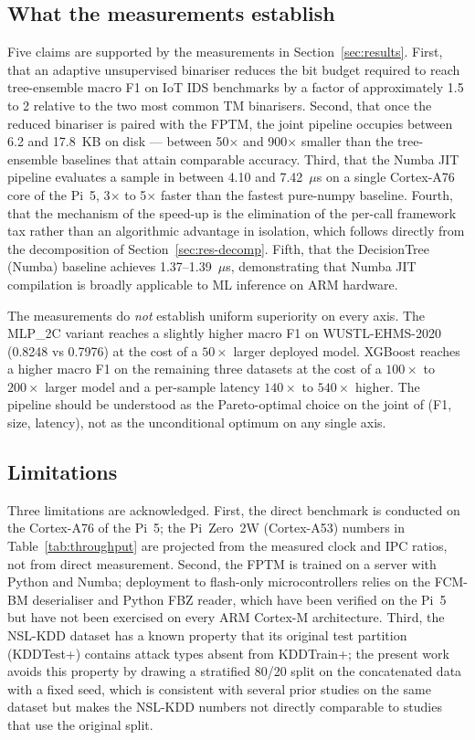 \documentclass[journal,10pt]{IEEEtran}
\begin{document}
\subsection{What the measurements establish}
\label{sec:disc-establish}
Five claims are supported by the measurements in
Section~\ref{sec:results}. First, that an adaptive unsupervised
binariser reduces the bit budget required to reach tree-ensemble
macro F1 on IoT IDS benchmarks by a factor of approximately 1.5 to
2 relative to the two most common TM binarisers. Second, that once
the reduced binariser is paired with the FPTM, the joint pipeline
occupies between 6.2 and 17.8~KB on disk --- between 50$\times$
and 900$\times$ smaller than the tree-ensemble baselines that attain
comparable accuracy. Third, that the Numba JIT pipeline evaluates a
sample in between 4.10 and 7.42~$\mu$s on a single Cortex-A76 core
of the Pi~5, 3$\times$ to 5$\times$ faster than the fastest
pure-numpy baseline. Fourth, that the mechanism of the
speed-up is the elimination of the per-call framework tax rather than
an algorithmic advantage in isolation, which follows directly from the
decomposition of Section~\ref{sec:res-decomp}. Fifth, that the
DecisionTree (Numba) baseline achieves 1.37--1.39~$\mu$s,
demonstrating that Numba JIT compilation is broadly applicable
to ML inference on ARM hardware.

The measurements do \emph{not} establish uniform superiority on every
axis. The MLP\_2C variant reaches a slightly higher macro F1 on
WUSTL-EHMS-2020 (0.8248 vs 0.7976) at the cost of a $50\times$ larger
deployed model. XGBoost reaches a higher macro F1 on the remaining
three datasets at the cost of a $100\times$ to $200\times$ larger
model and a per-sample latency $140\times$ to $540\times$ higher. The
pipeline should be understood as the Pareto-optimal choice on the
joint of (F1, size, latency), not as the unconditional optimum on any
single axis.

\subsection{Limitations}
\label{sec:disc-limits}
Three limitations are acknowledged. First, the direct benchmark is
conducted on the Cortex-A76 of the Pi~5; the Pi~Zero~2W
(Cortex-A53) numbers in Table~\ref{tab:throughput} are projected
from the measured clock and IPC ratios, not from direct measurement.
Second, the
FPTM is trained on a server with Python and Numba; deployment to
flash-only microcontrollers relies on the FCM-BM deserialiser and Python FBZ reader, which
have been verified on the Pi~5 but have not been exercised on every ARM
Cortex-M architecture. Third, the NSL-KDD dataset has a known
property that its original test partition (KDDTest+) contains attack
types absent from KDDTrain+; the present work avoids this property
by drawing a stratified 80/20 split on the concatenated data with a
fixed seed, which is consistent with several prior studies on the
same dataset but makes the NSL-KDD numbers not directly comparable to
studies that use the original split.
\end{document}
